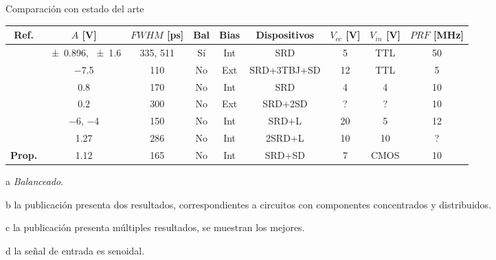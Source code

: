 \documentclass{beamer}
\begin{document}
\begin{frame}{Comparación con estado del arte}

    \begin{table}[t!]
        \begin{threeparttable}[b]
            {\tiny
                \begin{tabular}{ccccccccc}
                    \hline
                    Ref. & $A$ [\unit{\volt}] & $FWHM$ [\unit{\pico\second}] &
                    Bal \tnote{a} & Bias & Dispositivos & $V_{cc}$ [\unit{\volt}] & $V_{in}$ [\unit{\volt}] & $PRF$ [\unit{\mega\hertz}] \\
                    \hline
                    \cite{rulikowski2004} & \num{\pm 0.896}, \num{\pm 1.6} \tnote{b} & 335, 511 & Sí & Int & SRD & 5 & TTL & 50 \\
                    \cite{protiva2009} & \num{-7.5} & 110 & No & Ext & SRD+3TBJ+SD & 12 & TTL & 5 \\
                    \cite{kamal2014} & \num{0.8} & 170 & No & Int & SRD & 4 & 4 & 10 \\
                    \cite{han2002} & \num{0.2} & 300 & No & Ext & SRD+2SD & ? & ? & 10 \\
                    \cite{han2005} & \num{-6}, \num{-4} & 150 & No & Int & SRD+L & 20 & 5 & 12 \\
                    \cite{oloumi2018} & \num{1.27} \tnote{c} & 286 & No & Int & 2SRD+L & 10 & 10 \tnote{d} & ? \\
                    \textbf{Prop.} & \num{1.12} & 165 & No & Int & SRD+SD & 7 & CMOS  &
                    \num{10} \\
                \end{tabular}
            }
            {\tiny
                \begin{tablenotes}
                    \item [a] \textit{Balanceado}.
                    \item [b] la publicación presenta dos resultados, correspondientes a
                    circuitos con componentes concentrados y distribuidos.
                    \item [c] la publicación presenta múltiples resultados, se muestran
                    los mejores.
                    \item [d] la señal de entrada es senoidal.
                \end{tablenotes}
            }
        \end{threeparttable}
        \label{tab:resultados_literatura}
    \end{table}


\end{frame}
\end{document}
